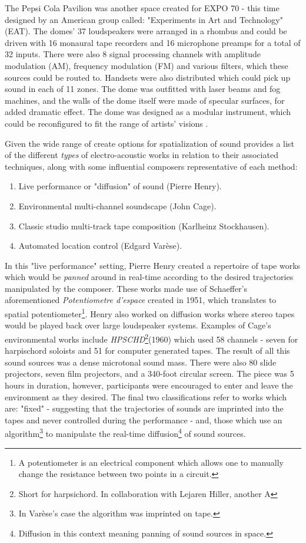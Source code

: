 The Pepsi Cola Pavilion was another space created for EXPO 70 - this time designed by an American group called: "Experiments in Art and Technology" (EAT). The domes' 37 loudspeakers were arranged in a rhombus and could be driven with 16 monaural tape recorders and 16 microphone preamps for a total of 32 inputs. There were also 8 signal processing channels with amplitude modulation (AM), frequency modulation (FM) and various filters, which these sources could be routed to. Handsets were also distributed which could pick up sound in each of 11 zones. The dome was outfitted with laser beams and fog machines, and the walls of the dome itself were made of specular surfaces, for added dramatic effect. The dome was designed as a modular instrument, which could be reconfigured to fit the range of artists' visions \cite{bertrand2012pepsi}.

Given the wide range of create options for spatialization of sound \cite{zvonar2000extremely} provides a list of the different \textit{types} of electro-acoustic works in relation to their associated techniques, along with some influential composers representative of each method:

\begin{enumerate}
    \item Live performance or "diffusion" of sound (Pierre Henry).
    \item Environmental multi-channel soundscape (John Cage).
    \item Classic studio multi-track tape composition (Karlheinz Stockhausen).
    \item Automated location control (Edgard Varèse).
\end{enumerate}

In this "live performance" setting, Pierre Henry created a repertoire of tape works which would be \textit{panned} around in real-time according to the desired trajectories manipulated by the composer. These works made use of Schaeffer's aforementioned \textit{Potentiometre d'espace} created in 1951, which translates to spatial potentiometer\footnote{A potentiometer is an electrical component which allows one to manually change the resistance between two points in a circuit.}. Henry also worked on diffusion works where stereo tapes would be played back over large loudspeaker systems. Examples of Cage's environmental works include \textit{HPSCHD}\footnote{Short for harpsichord. In collaboration with Lejaren Hiller, another A}(1960) which used 58 channels - seven for harpischord soloists and 51 for computer generated tapes. The result of all this sound sources was a dense microtonal sound mass. There were also 80 slide projectors, seven film projectors, and a 340-foot circular screen. The piece was 5 hours in duration, however, participants were encouraged to enter and leave the environment as they desired. The final two classifications refer to works which are: "fixed" - suggesting that the trajectories of sounds are imprinted into the tapes and never controlled during the performance - and, those which use an algorithm\footnote{In Varèse's case the algorithm was imprinted on tape.} to manipulate the real-time diffusion\footnote{Diffusion in this context meaning panning of sound sources in space.} of sound sources. 

